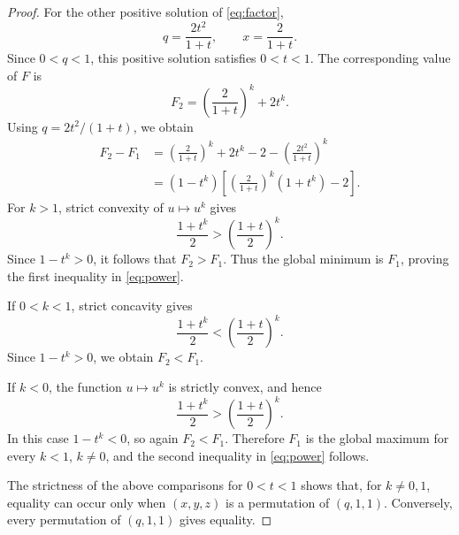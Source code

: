 \documentclass[10pt,a4paper]{amsart}
\begin{document}
\begin{proof}
For the other positive solution of \eqref{eq:factor},
\[
 q=\frac{2t^2}{1+t},\qquad x=\frac{2}{1+t}.
\]
Since $0<q<1$, this positive solution satisfies $0<t<1$. The corresponding value of $F$ is
\[
 F_2=\left(\frac{2}{1+t}\right)^k+2t^k.
\]
Using $q=2t^2/(1+t)$, we obtain
\begin{align*}
 F_2-F_1
 &=\left(\frac{2}{1+t}\right)^k+2t^k-2
   -\left(\frac{2t^2}{1+t}\right)^k\\
 &=(1-t^k)\left[\left(\frac{2}{1+t}\right)^k(1+t^k)-2\right].
\end{align*}
For $k>1$, strict convexity of $u\mapsto u^k$ gives
\[
 \frac{1+t^k}{2}>\left(\frac{1+t}{2}\right)^k.
\]
Since $1-t^k>0$, it follows that $F_2>F_1$. Thus the global minimum is
$F_1$, proving the first inequality in \eqref{eq:power}.

If $0<k<1$, strict concavity gives
\[
 \frac{1+t^k}{2}<\left(\frac{1+t}{2}\right)^k.
\]
Since $1-t^k>0$, we obtain $F_2<F_1$.

If $k<0$, the function $u\mapsto u^k$ is strictly convex, and hence
\[
 \frac{1+t^k}{2}>\left(\frac{1+t}{2}\right)^k.
\]
In this case $1-t^k<0$, so again $F_2<F_1$. Therefore $F_1$ is the
global maximum for every $k<1$, $k\ne0$, and the second inequality in
\eqref{eq:power} follows.

The strictness of the above comparisons for $0<t<1$ shows that, for
$k\ne0,1$, equality can occur only when $(x,y,z)$ is a permutation of
$(q,1,1)$. Conversely, every permutation of $(q,1,1)$ gives equality.
\end{proof}
\end{document}
